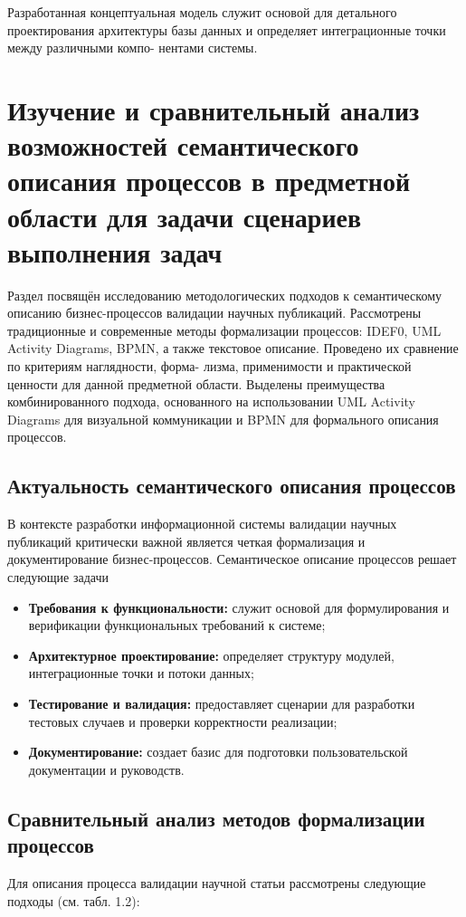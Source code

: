 Разработанная концептуальная модель служит основой для детального проектирования
архитектуры базы данных и определяет интеграционные точки между различными компо-
нентами системы.

\section{Изучение и сравнительный анализ возможностей семантического 
описания процессов в предметной области для задачи сценариев выполнения задач}

\begin{annotation}
	Раздел посвящён исследованию методологических подходов к семантическому 
	описанию бизнес-процессов валидации научных публикаций. Рассмотрены традиционные
	и современные методы формализации процессов: IDEF0, UML Activity Diagrams, BPMN, а
	также текстовое описание. Проведено их сравнение по критериям наглядности, форма-
	лизма, применимости и практической ценности для данной предметной области. Выделены
	преимущества комбинированного подхода, основанного на использовании UML Activity
	Diagrams для визуальной коммуникации и BPMN для формального описания процессов. 
\end{annotation}

\subsection{Актуальность семантического описания процессов}
В контексте разработки информационной системы валидации научных публикаций критически
важной является четкая формализация и документирование бизнес-процессов. Семантическое
описание процессов решает следующие задачи

\begin{itemize}
	\item \textbf{Требования к функциональности:} служит основой для формулирования и верификации функциональных требований к системе;
	\item \textbf{Архитектурное проектирование:} определяет структуру модулей, интеграционные точки и потоки данных;
	\item \textbf{Тестирование и валидация:} предоставляет сценарии для разработки тестовых случаев и проверки корректности реализации;
	\item \textbf{Документирование:} создает базис для подготовки пользовательской документации и руководств.
\end{itemize}

\subsection{Сравнительный анализ методов формализации процессов}
Для описания процесса валидации научной статьи рассмотрены следующие подходы (см. табл. 1.2):

